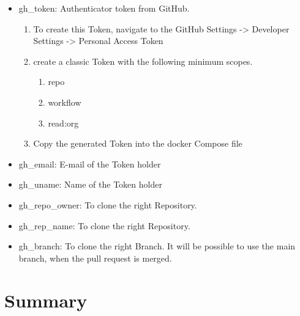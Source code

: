 \documentclass[a4paper, 12pt, oneside]{scrbook}
\begin{document}
		\begin{itemize}
			\item gh\_token:  Authenticator token from GitHub. 
			\begin{enumerate}
				\item To create this Token, navigate to the GitHub Settings -> Developer Settings -> Personal Access Token
				\item create a classic Token with the following minimum scopes.
				\begin{enumerate}
					\item repo
					\item workflow
					\item read:org
				\end{enumerate}
				\item Copy the generated Token into the docker Compose file
			\end{enumerate}
			\item gh\_email:  E-mail of the Token holder
			\item gh\_uname:  Name of the Token holder
			\item gh\_repo\_owner:  To clone the right Repository.
			\item gh\_rep\_name:  To clone the right Repository.
			\item gh\_branch:  To clone the right Branch. It will be possible to use the main branch, when the pull request is merged.
		\end{itemize}
		
		\noindent 
		
	\chapter{Summary} %
	
	\frontmatter
	\printbibliography
\end{document}
